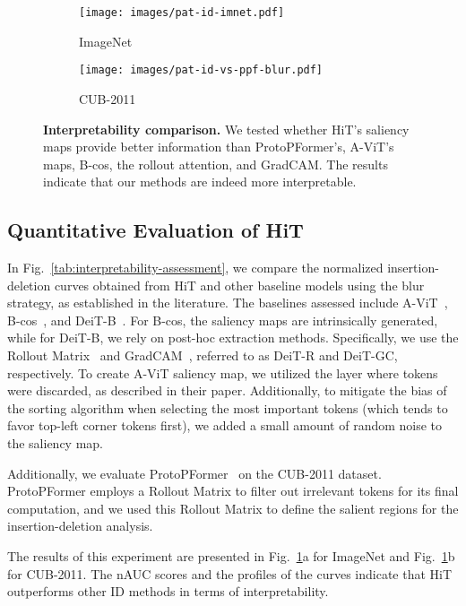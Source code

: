 \begin{figure}[t]
    \centering
    \begin{subfigure}{0.49\textwidth}
        \centering
        \texttt{[image: images/pat-id-imnet.pdf]}
        \caption{ImageNet}
    \end{subfigure}
    \begin{subfigure}{0.49\textwidth}
        \centering
        \texttt{[image: images/pat-id-vs-ppf-blur.pdf]}
        \caption{CUB-2011}
    \end{subfigure}
    \caption{\textbf{Interpretability comparison.} We tested whether HiT's saliency maps provide better information than ProtoPFormer's, A-ViT's maps, B-cos, the rollout attention, and GradCAM. The results indicate that our methods are indeed more interpretable. %
    }
    \label{fig:ppf-vs-hit}
\end{figure}


\subsection{Quantitative Evaluation of HiT}
\label{sec:exps:quantitative}



In Fig.~\ref{tab:interpretability-assessment}, we compare the normalized insertion-deletion curves obtained from HiT and other baseline models using the blur strategy, as established in the literature. The baselines assessed include A-ViT~\cite{yin2022avit}, B-cos~\cite{Boehle2024TPAMI}, and DeiT-B~\cite{pmlr-v139-touvron21a}. For B-cos, the saliency maps are intrinsically generated, while for DeiT-B, we rely on post-hoc extraction methods. Specifically, we use the Rollout Matrix~\cite{abnar2020quantifying} and GradCAM~\cite{8237336}, referred to as DeiT-R and DeiT-GC, respectively. To create A-ViT saliency map, we utilized the layer where tokens were discarded, as described in their paper. Additionally, to mitigate the bias of the sorting algorithm when selecting the most important tokens (which tends to favor top-left corner tokens first), we added a small amount of random noise to the saliency map.


Additionally, we evaluate ProtoPFormer~\cite{Xue2022ProtoPFormerCO} on the CUB-2011 dataset. ProtoPFormer employs a Rollout Matrix to filter out irrelevant tokens for its final computation, and we used this Rollout Matrix to define the salient regions for the insertion-deletion analysis.


The results of this experiment are presented in Fig.~\ref{fig:ppf-vs-hit}a for ImageNet and Fig.~\ref{fig:ppf-vs-hit}b for CUB-2011. The nAUC scores and the profiles of the curves indicate that HiT outperforms other ID methods in terms of interpretability.

